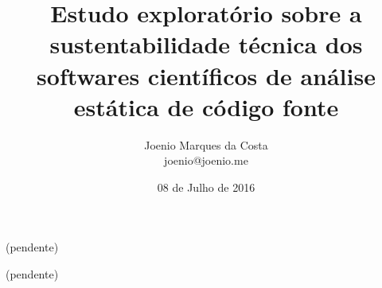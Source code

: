 \documentclass[msc, classic, a4paper]{ufbathesis}
\date{08 de Julho de 2016}
\title{
  Estudo exploratório sobre a sustentabilidade técnica dos softwares
  científicos de análise estática de código fonte
}
\author{Joenio Marques da Costa\\
  {\small joenio@joenio.me}
}
\begin{document}
\frontpage
\frontmatter
\presentationpage

\resumo

(pendente)

\begin{keywords}

  (pendente)

\end{keywords}

\tableofcontents
\listoffigures
\listoftables

\mainmatter










\backmatter


\appendix


\end{document}

